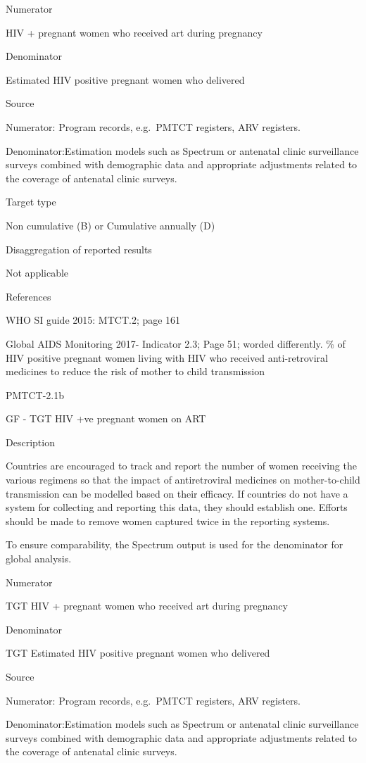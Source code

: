 \documentclass[]{book}
\begin{document}
Numerator

HIV + pregnant women who received art during pregnancy

Denominator

Estimated HIV positive pregnant women who delivered

Source

Numerator: Program records, e.g.~PMTCT registers, ARV registers.

Denominator:Estimation models such as Spectrum or antenatal clinic surveillance surveys combined with demographic data and appropriate adjustments related to the coverage of antenatal clinic surveys.

Target type

Non cumulative (B) or Cumulative annually (D)

Disaggregation of reported results

Not applicable

References

WHO SI guide 2015: MTCT.2; page 161

Global AIDS Monitoring 2017- Indicator 2.3; Page 51; worded differently.
\% of HIV positive pregnant women living with HIV who received anti-retroviral medicines to reduce the risk of mother to child transmission

PMTCT-2.1b

GF - TGT HIV +ve pregnant women on ART

Description

Countries are encouraged to track and report the number of women receiving the various regimens so that the impact of antiretroviral medicines on mother-to-child transmission can be modelled based on their efficacy. If countries do not have a system for collecting and reporting this data, they should establish one. Efforts should be made to remove women captured twice in the reporting systems.

To ensure comparability, the Spectrum output is used for the denominator for global analysis.

Numerator

TGT HIV + pregnant women who received art during pregnancy

Denominator

TGT Estimated HIV positive pregnant women who delivered

Source

Numerator: Program records, e.g.~PMTCT registers, ARV registers.

Denominator:Estimation models such as Spectrum or antenatal clinic surveillance surveys combined with demographic data and appropriate adjustments related to the coverage of antenatal clinic surveys.
\end{document}
